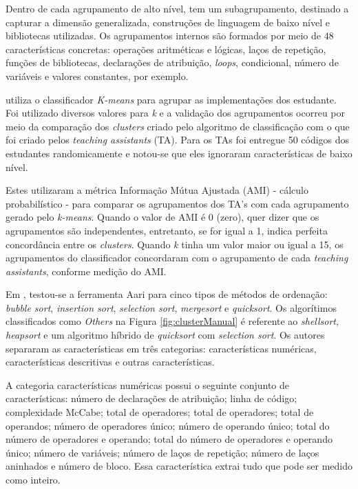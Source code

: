     Dentro de cada agrupamento de alto nível, tem um subagrupamento, destinado a
    capturar a dimensão generalizada, construções de linguagem de baixo nível e
    bibliotecas utilizadas. Os agrupamentos internos são formados por meio de 48
    características concretas: operações aritméticas e lógicas, laços de repetição,
    funções de bibliotecas, declarações de atribuição, \textit{loops}, condicional,
    número de variáveis e valores constantes, por exemplo.
    
     utiliza o classificador \textit{K-means} para agrupar
    as implementações dos estudante. Foi utilizado diversos valores para \textit{k}
    e a validação dos agrupamentos ocorreu por meio da comparação dos \textit{clusters}
    criado pelo algoritmo de classificação com o que foi criado pelos
    \textit{teaching assistants} (TA). Para os TAs foi entregue 50 códigos
    dos estudantes randomicamente e notou-se que eles ignoraram características
    de baixo nível.
    
    Estes utilizaram a métrica Informação Mútua Ajustada (AMI) - cálculo
    probabilístico - para comparar os agrupamentos dos TA's com cada agrupamento
    gerado pelo \textit{k-means}. Quando o valor de AMI é 0 (zero), quer dizer
    que os agrupamentos são independentes, entretanto, se for igual a 1, indica
    perfeita concordância entre os \textit{clusters}. Quando \textit{k} tinha um
    valor maior ou igual a 15, os agrupamentos do classificador concordaram com
    o agrupamento de cada \textit{teaching assistants}, conforme medição do AMI.
    
    Em , testou-se a ferramenta Aari para cinco tipos
    de métodos de ordenação: \textit{bubble sort}, \textit{insertion sort},
    \textit{selection sort}, \textit{mergesort} e \textit{quicksort}. Os
    algorítimos classificados como \textit{Others} na Figura \ref{fig:clusterManual}
    é referente ao \textit{shellsort}, \textit{heapsort} e um algoritmo híbrido de
    \textit{quicksort} com \textit{selection sort}. Os autores separaram as
    características em três categorias: características numéricas, características
    descritivas e outras características.
    
    A categoria características numéricas possui o seguinte conjunto de características:
    número de declarações de atribuição; linha de código; complexidade McCabe; total de
    operadores; total de operadores; total de operandos; número de operadores único;
    número de operando único; total do número de operadores e operando; total do
    número de operadores e operando único; número de variáveis; número de laços de
    repetição; número de laços aninhados e número de bloco. Essa característica
    extrai tudo que pode ser medido como inteiro.
    
